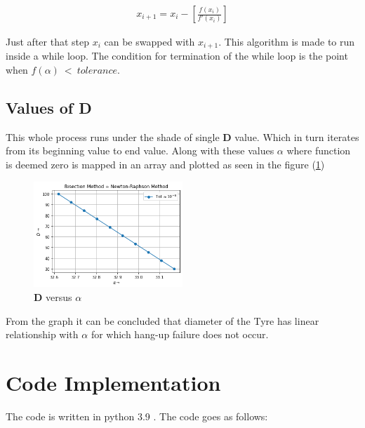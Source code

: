 \documentclass[11pt,a4paper]{article}
\begin{document}
\begin{align*}
x_{i+1} = x_{i} - \left[\frac{f(x_i)}{f'(x_i)}\right]
\end{align*}

Just after that  step $x_{i}$ can be swapped with $x_{i+1}$. This algorithm is made to run inside a while loop. The condition for termination of the while loop is the point when $f(\alpha)\ < \ tolerance $.

\subsection*{Values of D}

This whole process runs under the shade of single \textbf{D} value. Which in turn iterates from its beginning value to end value. Along with these values $\alpha$ where function is deemed zero is mapped in an array and plotted as seen in the figure (\ref{fig:4}) 

	\begin{figure}[H]	
	\begin{center}
	\includegraphics[width=0.5\textwidth]{Bisection_Method.png}
	\caption{\textbf{D} versus $\alpha$ }
	\label{fig:4}	
	\end{center}
	\end{figure}

From the graph it can be concluded that diameter of the Tyre has linear relationship with $\alpha$ for which hang-up failure does not occur.

\section*{Code Implementation}

The code is written in python 3.9 . The code goes as follows:
\end{document}
